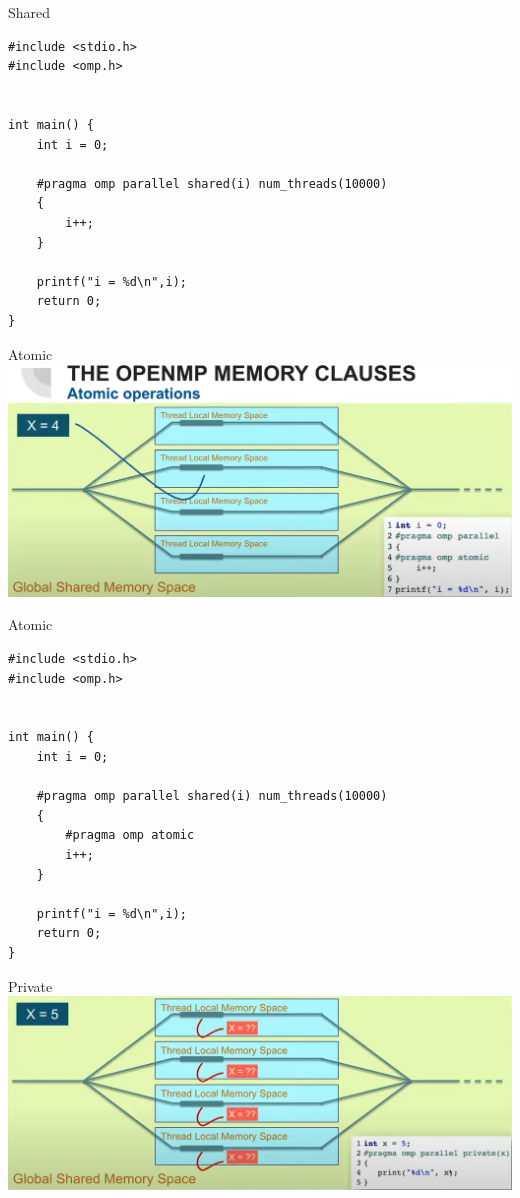 \documentclass{beamer}
\begin{document}
\begin{frame}[fragile]{Shared}
\lstset{language=C++}
  \begin{lstlisting}
#include <stdio.h>
#include <omp.h>


int main() {
    int i = 0;

    #pragma omp parallel shared(i) num_threads(10000)
    {
        i++;
    }

    printf("i = %d\n",i);
    return 0;
}    
  \end{lstlisting}
\end{frame}

\begin{frame}{Atomic}
  \includegraphics[width=\textwidth]{atomic}  
\end{frame}

\begin{frame}[fragile]{Atomic}
\lstset{language=C++}
  \begin{lstlisting}
#include <stdio.h>
#include <omp.h>


int main() {
    int i = 0;

    #pragma omp parallel shared(i) num_threads(10000)
    {
        #pragma omp atomic
        i++;
    }

    printf("i = %d\n",i);
    return 0;
}
  \end{lstlisting}
\end{frame}

\begin{frame}{Private}
  \includegraphics[width=\textwidth]{private}
\end{frame}
\end{document}

